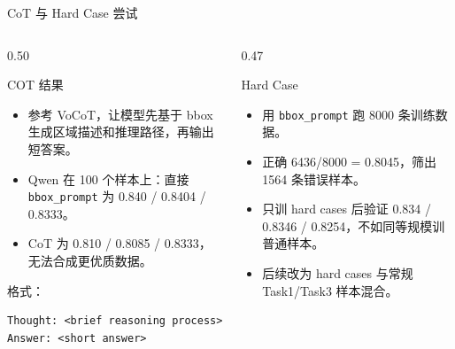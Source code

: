\documentclass{beamer}
\newcommand{\metric}[3]{\textsf{#1 / #2 / #3}}
\begin{document}
\begin{frame}[fragile]{CoT 与 Hard Case 尝试}
\small
\begin{columns}[T,onlytextwidth]
\begin{column}{0.50\textwidth}
\begin{block}{COT 结果}
\begin{itemize}
\item 参考 VoCoT，让模型先基于 bbox 生成区域描述和推理路径，再输出短答案。
\item Qwen 在 100 个样本上：直接 \texttt{bbox\_prompt} 为 \metric{0.840}{0.8404}{0.8333}。
\item CoT 为 \metric{0.810}{0.8085}{0.8333}，无法合成更优质数据。
\end{itemize}
\scriptsize
格式：
\vspace{-1em}
\begin{verbatim}
Thought: <brief reasoning process>
Answer: <short answer>
\end{verbatim}
\end{block}
\end{column}
\begin{column}{0.47\textwidth}
\begin{block}{Hard Case}
\begin{itemize}
\item 用 \texttt{bbox\_prompt} 跑 8000 条训练数据。
\item 正确 6436/8000 = 0.8045，筛出 1564 条错误样本。
\item 只训 hard cases 后验证 \metric{0.834}{0.8346}{0.8254}，不如同等规模训普通样本。
\item 后续改为 hard cases 与常规 Task1/Task3 样本混合。
\end{itemize}
\end{block}
\end{column}
\end{columns}
\end{frame}
\end{document}
